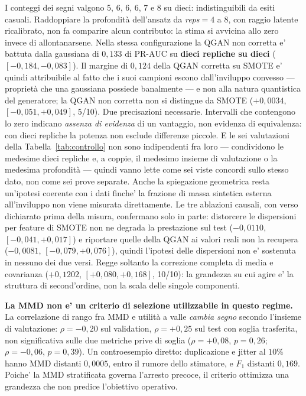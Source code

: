 \documentclass[10pt,conference,a4paper,twocolumn]{IEEEtran}
\begin{document}
I conteggi dei segni valgono 5, 6, 6, 6, 7 e 8 su dieci: indistinguibili da esiti casuali. Raddoppiare la profondità dell'ansatz da \textit{reps}$=4$ a $8$, con raggio latente ricalibrato, non fa comparire alcun contributo: la stima si avvicina allo zero invece di allontanarsene. Nella stessa configurazione la QGAN non corretta e' battuta dalla gaussiana di $0{,}133$ di PR-AUC su \textbf{dieci repliche su dieci} ($[-0{,}184, -0{,}083]$). Il margine di $0{,}124$ della QGAN corretta su SMOTE e' quindi attribuibile al fatto che i suoi campioni escono dall'inviluppo convesso — proprietà che una gaussiana possiede banalmente — e non alla natura quantistica del generatore; la QGAN non corretta non si distingue da SMOTE ($+0{,}0034$, $[-0{,}051, +0{,}049]$, 5/10). Due precisazioni necessarie. Intervalli che contengono lo zero indicano \emph{assenza di evidenza} di un vantaggio, non evidenza di equivalenza: con dieci repliche la potenza non esclude differenze piccole. E le sei valutazioni della Tabella~\ref{tab:controllo} non sono indipendenti fra loro — condividono le medesime dieci repliche e, a coppie, il medesimo insieme di valutazione o la medesima profondità — quindi vanno lette come sei viste concordi sullo stesso dato, non come sei prove separate. Anche la spiegazione geometrica resta un'ipotesi coerente con i dati finche' la frazione di massa sintetica esterna all'inviluppo non viene misurata direttamente. Le tre ablazioni causali, con verso dichiarato prima della misura, confermano solo in parte: distorcere le dispersioni per feature di SMOTE non ne degrada la prestazione sul test ($-0{,}0110$, $[-0{,}041, +0{,}017]$) e riportare quelle della QGAN ai valori reali non la recupera ($-0{,}0081$, $[-0{,}079, +0{,}076]$), quindi l'ipotesi delle dispersioni non e' sostenuta in nessuno dei due versi. Regge soltanto la correzione completa di media e covarianza ($+0{,}1202$, $[+0{,}080, +0{,}168]$, 10/10): la grandezza su cui agire e' la struttura di second'ordine, non la scala delle singole componenti.

\textbf{La MMD non e' un criterio di selezione utilizzabile in questo regime.} La correlazione di rango fra MMD e utilità a valle \emph{cambia segno} secondo l'insieme di valutazione: $\rho = -0{,}20$ sul validation, $\rho = +0{,}25$ sul test con soglia trasferita, non significativa sulle due metriche prive di soglia ($\rho = +0{,}08$, $p = 0{,}26$; $\rho = -0{,}06$, $p = 0{,}39$). Un controesempio diretto: duplicazione e jitter al $10\%$ hanno MMD distanti $0{,}0005$, entro il rumore dello stimatore, e $F_1$ distanti $0{,}169$. Poiche' la MMD stratificata governa l'arresto precoce, il criterio ottimizza una grandezza che non predice l'obiettivo operativo.
\end{document}
